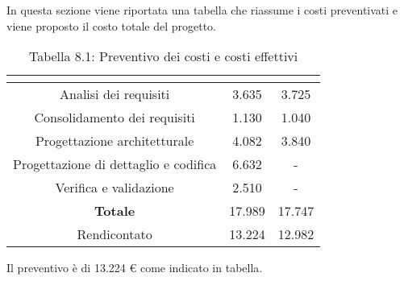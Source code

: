 In questa sezione viene riportata una tabella che riassume i costi preventivati e viene proposto il costo totale del progetto.
\\
\renewcommand{\arraystretch}{1.5}
\begin{table}[H]
\begin{center}
\begin{tabular}{|c|c|c|}
\hline
\rowcolor{title_row}
\textbf{\color{title_text}{Periodo}}  & \textbf{\color{title_text}{Preventivo \euro}} & \textbf{\color{title_text}{Consuntivo \euro}} \\ \hline
Analisi dei requisiti   & 3.635 & 3.725 \\ \hline
Consolidamento dei requisiti   & 1.130 & 1.040 \\ \hline
Progettazione architetturale    & 4.082 & 3.840 \\ \hline
Progettazione di dettaglio e codifica    & 6.632 & - \\ \hline
Verifica e validazione    & 2.510 & - \\ \hline
\textbf{Totale}   & 17.989 & 17.747 \\ \hline
Rendicontato   & 13.224 & 12.982 \\ \hline
\end{tabular}
\caption{Tabella 8.1: Preventivo dei costi e costi effettivi\label{}}
\end{center}
\end{table}
\renewcommand{\arraystretch}{1}

Il preventivo è di 13.224 \euro{} come indicato in tabella.
\newpage
